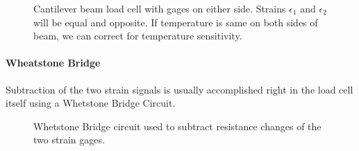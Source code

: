 \begin{figure}[ht]	%
\begin{center}
\caption{ Cantilever beam load cell with gages on either side.	%
 Strains $\epsilon_1$ and $\epsilon_2$ will be equal and opposite.	%
 If temperature is same on both sides of beam, we can correct	%
 for temperature sensitivity.  }	%
\end{center}
\end{figure}	%

\paragraph{Wheatstone Bridge}

 Subtraction of the two strain signals is usually accomplished right	%
 in the load cell itself using a Whetstone Bridge Circuit.	%
\begin{figure}[ht]	%
\begin{center}
\caption{ Whetstone Bridge circuit used to subtract resistance	%
 changes of the two strain gages.  }	%
\end{center}
\end{figure}	%

